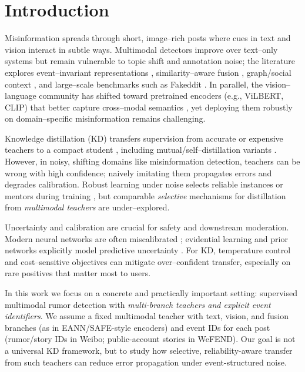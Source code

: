 \section{Introduction}
Misinformation spreads through short, image–rich posts where cues in text and vision interact in subtle ways. Multimodal detectors improve over text–only systems but remain vulnerable to topic shift and annotation noise; the literature explores event–invariant representations \citep{Wang2018EANN}, similarity–aware fusion \citep{Zhou2020SAFE}, graph/social context \citep{Lu2020GCAN,Nguyen2020FANG}, and large–scale benchmarks such as Fakeddit \citep{Nakamura2020Fakeddit}. In parallel, the vision–language community has shifted toward pretrained encoders (e.g., ViLBERT, CLIP) that better capture cross–modal semantics \citep{ViLBERT2019,Radford2021CLIP}, yet deploying them robustly on domain–specific misinformation remains challenging.

Knowledge distillation (KD) transfers supervision from accurate or expensive teachers to a compact student \citep{Hinton2015Distillation,Gou2021KDsurvey}, including mutual/self–distillation variants \citep{Zhang2018DML,Furlanello2018BAN}. However, in noisy, shifting domains like misinformation detection, teachers can be wrong with high confidence; naively imitating them propagates errors and degrades calibration. Robust learning under noise selects reliable instances or mentors during training \citep{Han2018Coteaching,MentorNet2018}, but comparable \emph{selective} mechanisms for distillation from \emph{multimodal teachers} are under–explored.

Uncertainty and calibration are crucial for safety and downstream moderation. Modern neural networks are often miscalibrated \citep{Guo2017Calibration}; evidential learning and prior networks explicitly model predictive uncertainty \citep{Sensoy2018EDL,Malinin2018PN}. For KD, temperature control and cost–sensitive objectives can mitigate over–confident transfer, especially on rare positives that matter most to users.

In this work we focus on a concrete and practically important setting: supervised multimodal rumor detection with \emph{multi-branch teachers and explicit event identifiers}. We assume a fixed multimodal teacher with text, vision, and fusion branches (as in EANN/SAFE-style encoders) and event IDs for each post (rumor/story IDs in Weibo; public-account stories in WeFEND). Our goal is not a universal KD framework, but to study how selective, reliability-aware transfer from such teachers can reduce error propagation under event-structured noise.

